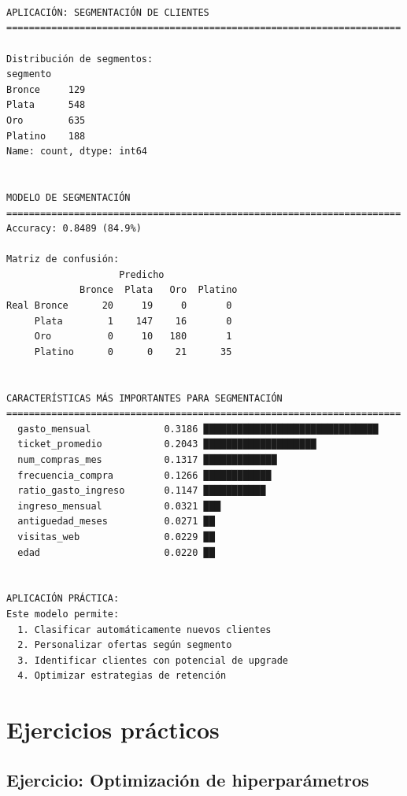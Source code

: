 \documentclass[
  doc,
  floatsintext,
  longtable,
  a4paper,
  nolmodern,
  notxfonts,
  notimes,
  12pt,
  colorlinks=true,linkcolor=blue,citecolor=blue,urlcolor=blue]{apa7}
\begin{document}
\begin{verbatim}



APLICACIÓN: SEGMENTACIÓN DE CLIENTES
======================================================================

Distribución de segmentos:
segmento
Bronce     129
Plata      548
Oro        635
Platino    188
Name: count, dtype: int64


MODELO DE SEGMENTACIÓN
======================================================================
Accuracy: 0.8489 (84.9%)

Matriz de confusión:
                    Predicho
             Bronce  Plata   Oro  Platino
Real Bronce      20     19     0       0
     Plata        1    147    16       0
     Oro          0     10   180       1
     Platino      0      0    21      35


CARACTERÍSTICAS MÁS IMPORTANTES PARA SEGMENTACIÓN
======================================================================
  gasto_mensual             0.3186 ███████████████████████████████
  ticket_promedio           0.2043 ████████████████████
  num_compras_mes           0.1317 █████████████
  frecuencia_compra         0.1266 ████████████
  ratio_gasto_ingreso       0.1147 ███████████
  ingreso_mensual           0.0321 ███
  antiguedad_meses          0.0271 ██
  visitas_web               0.0229 ██
  edad                      0.0220 ██


APLICACIÓN PRÁCTICA:
Este modelo permite:
  1. Clasificar automáticamente nuevos clientes
  2. Personalizar ofertas según segmento
  3. Identificar clientes con potencial de upgrade
  4. Optimizar estrategias de retención
\end{verbatim}

\section{Ejercicios prácticos}\label{ejercicios-pruxe1cticos}

\subsection{Ejercicio: Optimización de
hiperparámetros}\label{ejercicio-optimizaciuxf3n-de-hiperparuxe1metros}
\end{document}
